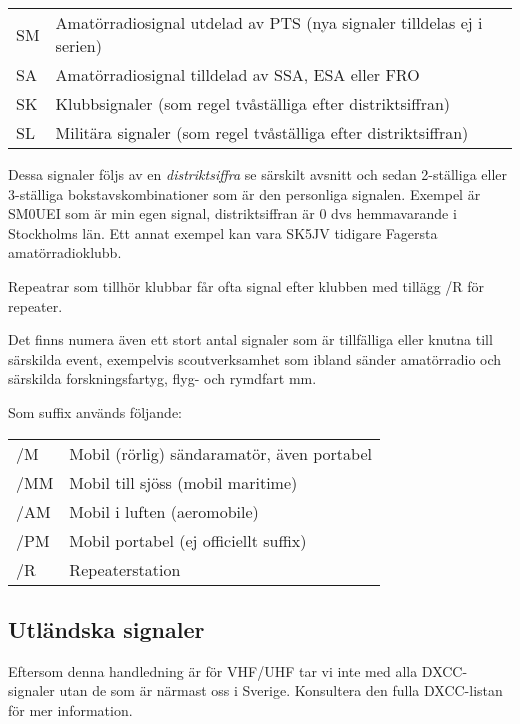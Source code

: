 \begin{tabular}{ll}
	SM & Amatörradiosignal utdelad av PTS (nya signaler tilldelas ej i serien) \\
	SA & Amatörradiosignal tilldelad av SSA, ESA eller FRO                     \\
	SK & Klubbsignaler (som regel tvåställiga efter distriktsiffran)           \\
	SL & Militära signaler (som regel tvåställiga efter distriktsiffran)
\end{tabular}

Dessa signaler följs av en \textit{distriktsiffra} se särskilt avsnitt och sedan 2-ställiga eller 3-ställiga bokstavskombinationer som är den personliga signalen. Exempel är SM0UEI som är min egen signal, distriktsiffran är 0 dvs hemmavarande i Stockholms län. Ett annat exempel kan vara SK5JV tidigare Fagersta amatörradioklubb.

Repeatrar som tillhör klubbar får ofta signal efter klubben med tillägg /R för repeater.

Det finns numera även ett stort antal signaler som är tillfälliga eller knutna till särskilda event, exempelvis scoutverksamhet som ibland sänder amatörradio och särskilda forskningsfartyg, flyg- och rymdfart mm.

Som suffix används följande:

\begin{tabular}{ll}
	/M  & Mobil (rörlig) sändaramatör, även portabel \\
	/MM & Mobil till sjöss (mobil maritime)          \\
	/AM & Mobil i luften (aeromobile)                \\
	/PM & Mobil portabel (ej officiellt suffix)\\
	/R  & Repeaterstation
\end{tabular}

\subsection{Utländska signaler}

Eftersom denna handledning är för VHF/UHF tar vi inte med alla DXCC-signaler utan de som är närmast oss i Sverige. Konsultera den fulla DXCC-listan för mer information.

